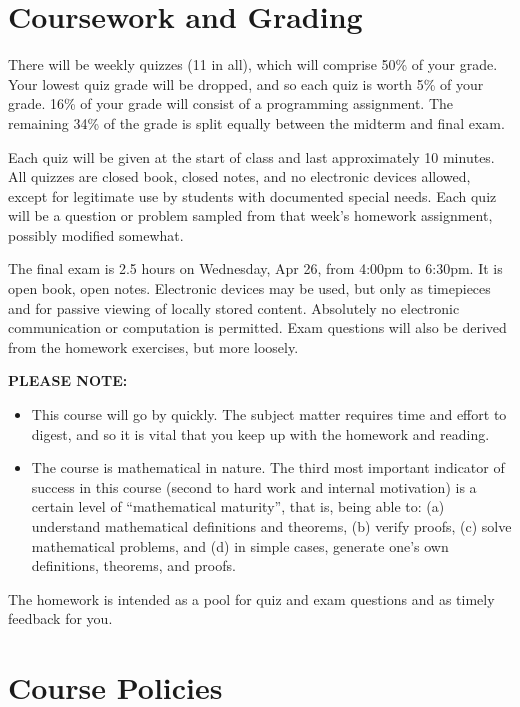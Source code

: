 \documentclass[11pt]{article}
\begin{document}
\section{Coursework and Grading}
There will be weekly quizzes (11 in all), which will comprise 50\% of
your grade. Your lowest quiz grade will be dropped, and so each quiz
is worth 5\% of your grade. 16\% of your grade will consist of a
programming assignment. The remaining 34\% of the grade is split equally
between the midterm and final exam.

Each quiz will be given at the start of class and last approximately
10 minutes. All quizzes are closed book, closed notes, and no
electronic devices allowed, except for legitimate use by students with
documented special needs. Each quiz will be a question or problem
sampled from that week's homework assignment, possibly modified
somewhat.

The final exam is 2.5 hours on Wednesday, Apr 26, from 4:00pm to
6:30pm. It is open book, open notes. Electronic devices may be used,
but only as timepieces and for passive viewing of locally stored
content. Absolutely no electronic communication or computation is
permitted. Exam questions will also be derived from the homework
exercises, but more loosely.

\textbf{PLEASE NOTE:}
\begin{itemize}
    \item
        This course will go by quickly. The subject matter requires
        time and effort to digest, and so it is vital that you keep up
        with the homework and reading.
    \item
        The course is mathematical in nature. The third most important
        indicator of success in this course (second to hard work and
        internal motivation) is a certain level of ``mathematical
        maturity'', that is, being able to: (a) understand
        mathematical definitions and theorems, (b) verify proofs, (c)
        solve mathematical problems, and (d) in simple cases, generate
        one's own definitions, theorems, and proofs.
\end{itemize}

The homework is intended as a pool for quiz and exam questions and as timely feedback for you.

\section{Course Policies}
\end{document}
